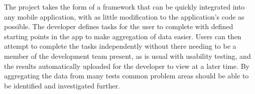 The project takes the form of a framework that can be quickly integrated into
any mobile application, with as little modification to the application's code
as possible. The developer defines tasks for the user to complete with defined
starting points in the app to make aggregation of data easier. Users can then
attempt to complete the tasks independently without there needing to be
a member of the development team present, as is usual with usability testing,
and the results automatically uploaded for the developer to view at a later
time. By aggregating the data from many tests common problem areas should be
able to be identified and investigated further.
